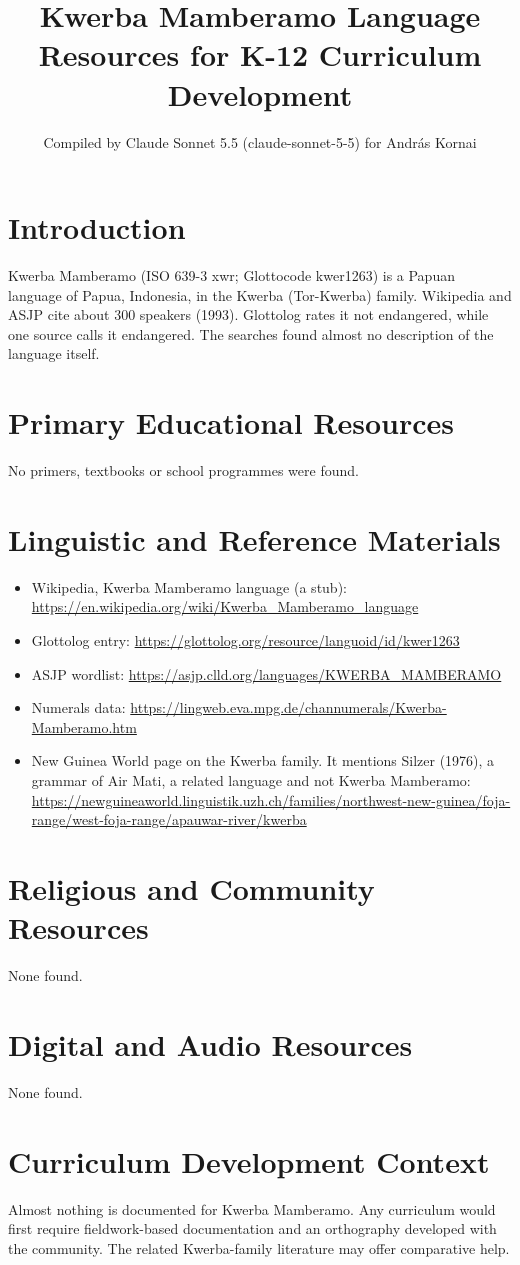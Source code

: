 \documentclass[12pt]{article}
\title{Kwerba Mamberamo Language Resources for K-12 Curriculum Development}
\author{Compiled by Claude Sonnet 5.5 (claude-sonnet-5-5) for Andr\'as Kornai}
\date{}
\begin{document}
\maketitle

\section{Introduction}
Kwerba Mamberamo (ISO 639-3 xwr; Glottocode kwer1263) is a Papuan language of Papua, Indonesia, in the Kwerba (Tor-Kwerba) family. Wikipedia and ASJP cite about 300 speakers (1993). Glottolog rates it not endangered, while one source calls it endangered. The searches found almost no description of the language itself.

\section{Primary Educational Resources}
No primers, textbooks or school programmes were found.

\section{Linguistic and Reference Materials}
\begin{itemize}
\item Wikipedia, Kwerba Mamberamo language (a stub): \url{https://en.wikipedia.org/wiki/Kwerba_Mamberamo_language}
\item Glottolog entry: \url{https://glottolog.org/resource/languoid/id/kwer1263}
\item ASJP wordlist: \url{https://asjp.clld.org/languages/KWERBA_MAMBERAMO}
\item Numerals data: \url{https://lingweb.eva.mpg.de/channumerals/Kwerba-Mamberamo.htm}
\item New Guinea World page on the Kwerba family. It mentions Silzer (1976), a grammar of Air Mati, a related language and not Kwerba Mamberamo: \url{https://newguineaworld.linguistik.uzh.ch/families/northwest-new-guinea/foja-range/west-foja-range/apauwar-river/kwerba}
\end{itemize}

\section{Religious and Community Resources}
None found.

\section{Digital and Audio Resources}
None found.

\section{Curriculum Development Context}
Almost nothing is documented for Kwerba Mamberamo. Any curriculum would first require fieldwork-based documentation and an orthography developed with the community. The related Kwerba-family literature may offer comparative help.
\end{document}
